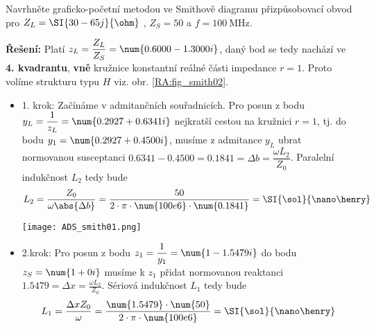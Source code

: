 \begin{example}
  Navrhněte graficko-početní metodou ve Smithově diagramu přizpůsobovací obvod pro 
  \(Z_L = \SI{30 - 65j}{\ohm}\) , \(Z_S = 50\)  a \(f = \SI{100}{\MHz}\).
  
  \textbf{Řešení:}
  Platí \(z_L = \dfrac{Z_L}{Z_S} = \num{0.6000 - 1.3000i}\), daný bod se tedy nachází ve 
  \textbf{4. kvadrantu}, \textbf{vně} kružnice konstantní reálné části impedance \(r = 
  1\). Proto volíme strukturu typu \(H\) viz. obr. \ref{RA:fig_smith02}. 
  \newline
  \begin{itemize}
    \item 1. krok: Začínáme v admitančních souřadnicích. Pro posun z bodu \(y_L = 
          \dfrac{1}{z_L} = \num{0.2927 + 0.6341i}\) nejkratší cestou na kružnici \(r = 1\), 
          tj. do bodu \(y_1 = \num{0.2927 + 0.4500i}\), musíme z admitance \(y_L\) ubrat 
          normovanou susceptanci \(\num{0.6341} - \num{0.4500} = \num{0.1841} = \Delta b = 
          \dfrac{\omega L_2}{Z_0}\). Paralelní indukčnost \(L_2\) tedy bude
          \ROUND[2]{\nmbrE}{\sol}
          \begin{equation*}
            L_2 = \frac{Z_0}{\omega\abs{\Delta b}} = 
                  \frac{50}{2\cdot\pi\cdot\num{100e6}\cdot\num{0.1841}} = \SI{\sol}{\nano\henry}
          \end{equation*}
    
           {\centering   %
            \captionsetup{type=figure}
            \texttt{[image: ADS\_smith01.png]}
            \label{RA:fig_ADS_smith01} 
            \par}
          
    \item 2.krok: Pro posun z bodu \(z_1 = \dfrac{1}{y_1} = \num{1 - 1.5479i}\) do bodu 
          \(z_S = \num{1 + 0i}\) musíme k \(z_1\) přidat normovanou reaktanci \(1.5479 = \Delta 
          x = \frac{\omega L_2}{Z_0}\). Sériová indukčnost \(L_1\) tedy bude
          \DIVIDE{\nmbrC}{\nmbrB}{\nmbrD}
          \ROUND[2]{\nmbrE}{\sol}
          \begin{equation*}
            L_1 = \frac{\Delta x Z_0}{\omega} = 
                  \frac{\num{1.5479}\cdot\num{50}}{2\cdot\pi\cdot\num{100e6}} = 
                  \SI{\sol}{\nano\henry}
          \end{equation*}
           

\end{itemize}
\end{example}
